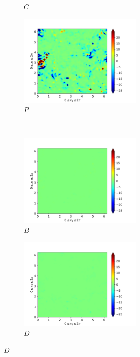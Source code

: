\begin{figure}[H]
\begin{subfigure}{0.45\textwidth}
        \caption{$C$}
    \end{subfigure}
    \newline
    \begin{subfigure}{0.45\textwidth}
        \includegraphics[height=1.75in]{media/run-cds-65/P-ke-1480}
        \caption{$P$}
    \end{subfigure}
    ~
    \begin{subfigure}{0.45\textwidth}
        \includegraphics[height=1.75in]{media/run-cds-65/B-ke-1480}
        \caption{$B$}
    \end{subfigure}
    \newline
    \begin{subfigure}{0.45\textwidth}
        \includegraphics[height=1.75in]{media/run-cds-65/D-ke-1480}
        \caption{$D$}
    \end{subfigure}
\end{figure}
